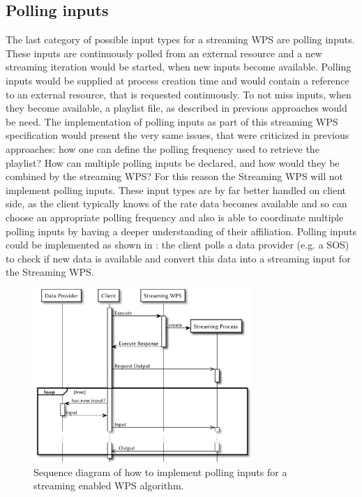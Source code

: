 		\subsection{Polling inputs}
			\label{sec:stream:input:polling}
			The last category of possible input types for a streaming \ac{WPS} are polling inputs. These inputs are continuously polled from an external resource and a new streaming iteration would be started, when new inputs become available. Polling inputs would be supplied at process creation time and would contain a reference to an external resource, that is requested continuously. To not miss inputs, when they become available, a playlist file, as described in previous approaches \citep{foerster2012live} would be need. The implementation of polling inputs as part of this streaming \ac{WPS} specification would present the very same issues, that were criticized in previous approaches: how one can define the polling frequency used to retrieve the playlist? How can multiple polling inputs be declared, and how would they be combined by the streaming \ac{WPS}? For this reason the Streaming \ac{WPS} will not implement polling inputs. These input types are by far better handled on client side, as the client typically knows of the rate data becomes available and so can choose an appropriate polling frequency and also is able to coordinate multiple polling inputs by having a deeper understanding of their affiliation. Polling inputs could be implemented as shown in : the client polls a data provider (e.g. a \ac{SOS}) to check if new data is available and convert this data into a streaming input for the Streaming \ac{WPS}.
			\begin{figure}[!htb]
				\centering
				\includegraphics[width=0.73521126760563382\textwidth]{figures/sequence-diagramm-polling.pdf}
				\caption{\label{fig:sd:polling}Sequence diagram of how to implement polling inputs for a streaming enabled WPS algorithm.}
			\end{figure}

